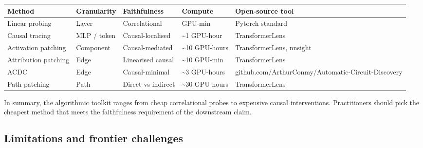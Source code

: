 {\def\LTcaptype{none} %
\begin{longtable}[]{@{}
  >{\raggedright\arraybackslash}p{}
  >{\raggedright\arraybackslash}p{}
  >{\raggedright\arraybackslash}p{}
  >{\raggedright\arraybackslash}p{}
  >{\raggedright\arraybackslash}p{}@{}}
\toprule\noalign{}
\begin{minipage}[b]{\linewidth}\raggedright
Method
\end{minipage} & \begin{minipage}[b]{\linewidth}\raggedright
Granularity
\end{minipage} & \begin{minipage}[b]{\linewidth}\raggedright
Faithfulness
\end{minipage} & \begin{minipage}[b]{\linewidth}\raggedright
Compute
\end{minipage} & \begin{minipage}[b]{\linewidth}\raggedright
Open-source tool
\end{minipage} \\
\midrule\noalign{}
\endhead
\bottomrule\noalign{}
\endlastfoot
Linear probing & Layer & Correlational & 1 GPU-min & Pytorch standard \\
Causal tracing & MLP / token & Causal-localised & \textasciitilde1 GPU-hour & TransformerLens \\
Activation patching & Component & Causal-mediated & \textasciitilde10 GPU-hours & TransformerLens, nnsight \\
Attribution patching & Edge & Linearised causal & \textasciitilde10 GPU-min & TransformerLens \\
ACDC & Edge & Causal-minimal & \textasciitilde3 GPU-hours & github.com/ArthurConmy/Automatic-Circuit-Discovery \\
Path patching & Path & Direct-vs-indirect & \textasciitilde30 GPU-hours & TransformerLens \\
\end{longtable}
}

In summary, the algorithmic toolkit ranges from cheap correlational probes to expensive causal interventions. Practitioners should pick the cheapest method that meets the faithfulness requirement of the downstream claim.

\subsection{Limitations and frontier challenges}\label{limitations-and-frontier-challenges}

